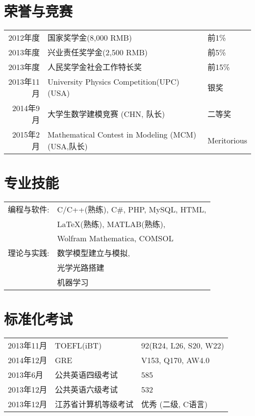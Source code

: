 \documentclass[CHN]{SealZhang}
\begin{document}
\section{荣誉与竞赛}
\begin{tabular}{rll}
    \textsc{2012年度} & 国家奖学金\footnotesize(8,000 \textsc{RMB})\normalsize & 前1\%\\
    \textsc{2013年度} & 兴业责任奖学金\footnotesize(2,500 \textsc{RMB})\normalsize & 前5\%\\
    \textsc{2013年度} & 人民奖学金社会工作特长奖 & 前15\%\\
    \textsc{2013年11月} & University Physics Competition(UPC) \footnotesize (USA) \normalsize & 银奖 \\
    \textsc{2014年9月} & 大学生数学建模竞赛 \footnotesize (CHN, 队长) \normalsize & 二等奖 \\
     \textsc{2015年2月} & Mathematical Contest in Modeling (MCM)    \footnotesize (USA,队长) \normalsize &  Meritorious\\
\end{tabular}

\section{专业技能}
\begin{tabular}{rl}
 \textsc{编程与软件:}&C/C++(熟练), C\#, PHP, MySQL, HTML, \\& \LaTeX (熟练), MATLAB(熟练),\\ & Wolfram Mathematica, COMSOL\\
\textsc{理论与实践:}&数学模型建立与模拟, \\&光学光路搭建\\&机器学习\\
\end{tabular}

\section{标准化考试}
\begin{tabular}{l|ll}
 \textsc{2013年11月} & TOEFL(iBT) & 92(R24, L26, S20, W22) \\
 \textsc{2014年12月} & GRE & V153, Q170, AW4.0 \\
 \textsc{2013年6月} & 公共英语四级考试 & 585 \\
 \textsc{2013年12月} & 公共英语六级考试 & 532 \\
 \textsc{2013年12月} & 江苏省计算机等级考试 & 优秀 (二级, C语言) \\
\end{tabular}

\clearpage
\end{document}
